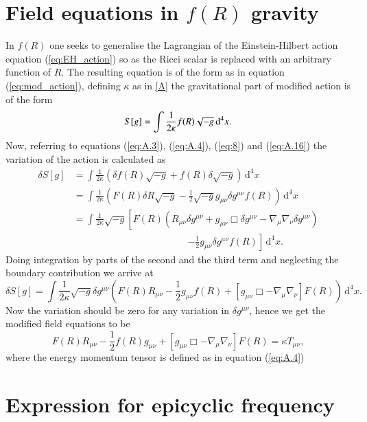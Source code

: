 \documentclass[12pt,a4paper,oneside]{book}
\newcommand{\eq}[2]{\begin{equation} \label{eq:#1} #2 \end{equation}}
\newcommand{\aeq}[2]{\begin{align} \label{eq:#1} #2 \end{align}}
\newcommand{\Eref}[1]{(\ref{eq:#1})}
\begin{document}
\chapter{Field equations in $f(R)$ gravity}
In $f(R)$ one seeks to generalise the Lagrangian of the Einstein-Hilbert action equation \Eref{EH_action} so as the Ricci scalar is replaced with an arbitrary function of $R$. The resulting equation is of the form as in equation \Eref{mod_action}, defining $\kappa$ as in \ref{A} the gravitational part of modified action is of the form
\eq{}{S[g]=\int {1 \over 2\kappa }f(R){\sqrt {-g}}\,\mathrm {d} ^{4}x.}
Now, referring to equations \Eref{A.3}, \Eref{A.4}, \Eref{8} and \Eref{A.16} the variation of the action is calculated as
\aeq{}{
\delta S[g]&=\int {\frac {1}{2\kappa }}\left(\delta f(R){\sqrt {-g}}+f(R)\delta {\sqrt {-g}}\right)\,
\mathrm {d} ^{4}x\\&=\int {\frac {1}{2\kappa }}\left(F(R)\delta R{\sqrt {-g}}-{\frac {1}{2}}{\sqrt {-g}}g_{\mu \nu }\delta g^{\mu \nu }f(R)\right)\,\mathrm {d} ^{4}x
\\&=\int {\frac {1}{2\kappa }}{\sqrt {-g}}\left[F(R)(R_{\mu \nu }\delta g^{\mu \nu }+g_{\mu \nu }\Box \delta g^{\mu \nu }-\nabla _{\mu }\nabla _{\nu }\delta g^{\mu \nu })\right.\nonumber
\\&\hspace{5cm}\left.-{\frac {1}{2}}g_{\mu \nu }\delta g^{\mu \nu }f(R)\right]\,\mathrm {d}
^{4}x.}
Doing integration by parts of the second and the third term and neglecting the boundary contribution we arrive at
\eq{}{ \delta S[g]=\int {\frac {1}{2\kappa }}{\sqrt {-g}}\delta g^{\mu \nu }\left(F(R)R_{\mu \nu }-{\frac {1}{2}}g_{\mu \nu }f(R)+[g_{\mu \nu }\Box -\nabla _{\mu }\nabla _{\nu }]F(R)\right)\,\mathrm {d} ^{4}x.}
Now the variation should be zero for any variation in $\delta g^{\mu \nu }$, hence we get the modified field equations to be
\eq{}{ F(R)R_{\mu \nu }-{\frac {1}{2}}f(R)g_{\mu \nu }+\left[g_{\mu \nu }\Box -\nabla _{\mu }\nabla _{\nu }\right]F(R)=\kappa T_{\mu \nu },}
where the energy momentum tensor is defined as in equation \Eref{A.4}


\chapter{Expression for epicyclic frequency}\label{epi_calc}
\end{document}

